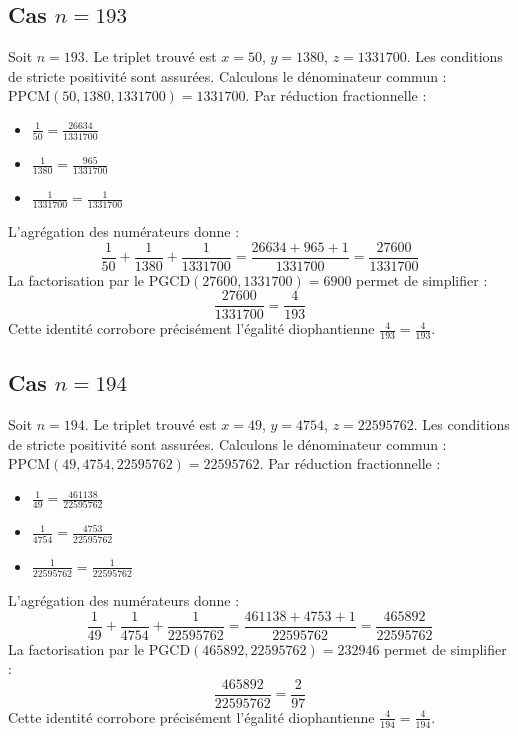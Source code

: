 \documentclass[11pt,a4paper]{article}
\begin{document}
\subsection{Cas $n = 193$}
Soit $n = 193$. Le triplet trouvé est $x = 50$, $y = 1380$, $z = 1331700$.
Les conditions de stricte positivité sont assurées.
Calculons le dénominateur commun : $\text{PPCM}(50, 1380, 1331700) = 1331700$.
Par réduction fractionnelle :
\begin{itemize}
    \item $\frac{1}{50} = \frac{26634}{1331700}$
    \item $\frac{1}{1380} = \frac{965}{1331700}$
    \item $\frac{1}{1331700} = \frac{1}{1331700}$
\end{itemize}
L'agrégation des numérateurs donne :
$$ \frac{1}{50} + \frac{1}{1380} + \frac{1}{1331700} = \frac{26634 + 965 + 1}{1331700} = \frac{27600}{1331700} $$
La factorisation par le $\text{PGCD}(27600, 1331700) = 6900$ permet de simplifier :
$$ \frac{27600}{1331700} = \frac{4}{193} $$
Cette identité corrobore précisément l'égalité diophantienne $\frac{4}{193} = \frac{4}{193}$.

\subsection{Cas $n = 194$}
Soit $n = 194$. Le triplet trouvé est $x = 49$, $y = 4754$, $z = 22595762$.
Les conditions de stricte positivité sont assurées.
Calculons le dénominateur commun : $\text{PPCM}(49, 4754, 22595762) = 22595762$.
Par réduction fractionnelle :
\begin{itemize}
    \item $\frac{1}{49} = \frac{461138}{22595762}$
    \item $\frac{1}{4754} = \frac{4753}{22595762}$
    \item $\frac{1}{22595762} = \frac{1}{22595762}$
\end{itemize}
L'agrégation des numérateurs donne :
$$ \frac{1}{49} + \frac{1}{4754} + \frac{1}{22595762} = \frac{461138 + 4753 + 1}{22595762} = \frac{465892}{22595762} $$
La factorisation par le $\text{PGCD}(465892, 22595762) = 232946$ permet de simplifier :
$$ \frac{465892}{22595762} = \frac{2}{97} $$
Cette identité corrobore précisément l'égalité diophantienne $\frac{4}{194} = \frac{4}{194}$.
\end{document}
